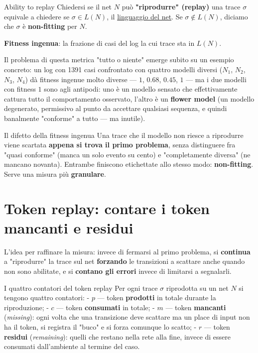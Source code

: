 \begin{boxdefinition}{Ability to replay}
Chiedersi se il net $N$ può \textbf{"riprodurre" (replay)} una trace $\sigma$ equivale a chiedere se $\sigma \in L(N)$, il \hyperref[ch:12]{linguaggio del net}. Se $\sigma \notin L(N)$, diciamo che $\sigma$ è \textbf{non-fitting} per $N$.

\textbf{Fitness ingenua}: la frazione di casi del log la cui trace sta in $L(N)$.
\end{boxdefinition}

Il problema di questa metrica "tutto o niente" emerge subito su un esempio concreto: un log con 1391 casi confrontato con quattro modelli diversi ($N_1$, $N_2$, $N_3$, $N_4$) dà fitness ingenue molto diverse — $1$, $0.68$, $0.45$, $1$ — ma i due modelli con fitness $1$ sono agli antipodi: uno è un modello sensato che effettivamente cattura tutto il comportamento osservato, l'altro è un \textbf{flower model} (un modello degenerato, permissivo al punto da accettare qualsiasi sequenza, e quindi banalmente "conforme" a tutto — ma inutile).

\begin{boxwarning}{Il difetto della fitness ingenua}
Una trace che il modello non riesce a riprodurre viene scartata \textbf{appena si trova il primo problema}, senza distinguere fra "quasi conforme" (manca un solo evento su cento) e "completamente diversa" (ne mancano novanta). Entrambe finiscono etichettate allo stesso modo: \textbf{non-fitting}. Serve una misura più \textbf{granulare}.
\end{boxwarning}

\section{\texorpdfstring{Token replay: contare i token mancanti e residui}{Token replay: contare i token mancanti e residui}}

L'idea per raffinare la misura: invece di fermarsi al primo problema, si \textbf{continua} a "riprodurre" la trace sul net \textbf{forzando} le transizioni a scattare anche quando non sono abilitate, e si \textbf{contano gli errori} invece di limitarsi a segnalarli.

\begin{boxdefinition}{I quattro contatori del token replay}
Per ogni trace $\sigma$ riprodotta su un net $N$ si tengono quattro contatori: - $p$ — token \textbf{prodotti} in totale durante la riproduzione; - $c$ — token \textbf{consumati} in totale; - $m$ — token \textbf{mancanti} (\emph{missing}): ogni volta che una transizione deve scattare ma un place di input non ha il token, si registra il "buco" e si forza comunque lo scatto; - $r$ — token \textbf{residui} (\emph{remaining}): quelli che restano nella rete alla fine, invece di essere consumati dall'ambiente al termine del caso.
\end{boxdefinition}

